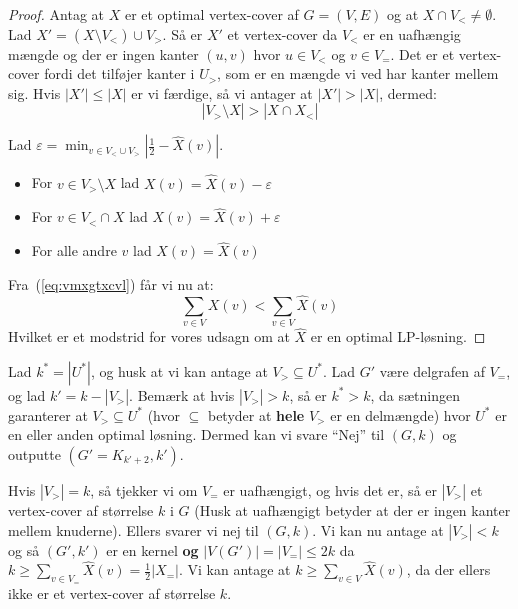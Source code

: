 \begin{proof}
	Antag at $X$ er et optimal vertex-cover af $G = (V,E)$ og at $X \cap V_{<} \ne \emptyset$. Lad $X' = (X \setminus V_{<}) \cup V_{>}$. Så er $X'$ et vertex-cover da $V_{<}$ er en uafhængig mængde og der er ingen kanter $(u,v)$ hvor $u \in V_{<}$ og $v \in V_{=}$. Det er et vertex-cover fordi det tilføjer kanter i $U_{>}$, som er en mængde vi ved har kanter mellem sig.
	Hvis $|X'| \le |X|$ er vi færdige, så vi antager at $|X'| > |X|$, dermed:
	\begin{equation}
		\label{eq:vmxgtxcvl}
		|V_{>} \setminus X| > |X \cap X_{<}|
	\end{equation}

	Lad \(\varepsilon = \min_{v \in V_{<} \cup V_{>}} |\frac{1}{2} - \hat{X}(v)| \).

	\begin{itemize}
		\item For $v \in V_{>} \setminus X$ lad $X(v) =  \hat{X}(v) - \varepsilon$
		\item For $v \in V_{<} \cap X$ lad $X(v) = \hat{X}(v) + \varepsilon$
		\item For alle andre $v$ lad $X(v) = \hat{X}(v)$
	\end{itemize}

	Fra~(\ref{eq:vmxgtxcvl}) får vi nu at:
	\begin{equation*}
		\sum_{v \in V} X(v) < \sum_{v \in V} \hat{X}(v)
	\end{equation*}
	Hvilket er et modstrid for vores udsagn om at $\hat{X}$ er en optimal LP-løsning.

\end{proof}

Lad $k^{*} = |U^{*}|$, og husk at vi kan antage at $V_{>} \subseteq U^{*}$.  Lad $G' $ være delgrafen af $V_{=}$, og lad $k' = k - |V_{>}|$. Bemærk at hvis $|V_{>}| > k$, så er $k^{*} > k$, da sætningen garanterer at $V_{>} \subseteq U^{*}$ (hvor $\subseteq$ betyder at \textbf{hele} $V_{>}$ er en delmængde) hvor $U^{*}$ er en eller anden optimal løsning. Dermed kan vi svare ``Nej'' til $(G,k)$ og outputte $(G' = K_{k'+2},k')$.

Hvis $|V_{>}|=k$, så tjekker vi om $V_{=}$ er uafhængigt, og hvis det er, så er $|V_{>}|$ et vertex-cover af størrelse $k$ i $G$ (Husk at uafhængigt betyder at der er ingen kanter mellem knuderne). Ellers svarer vi nej til $(G,k)$. Vi kan nu antage at $|V_{>}| < k$ og så $(G', k')$ er en kernel \textbf{og} $|V(G')| = |V_{=}| \le 2k$ da $k \ge \sum_{v \in V_{=}} \hat{X}(v) = \frac{1}{2}|X_{=}|$. Vi kan antage at $k \ge \sum_{v \in V} \hat{X}(v)$, da der ellers ikke er et vertex-cover af størrelse $k$.

